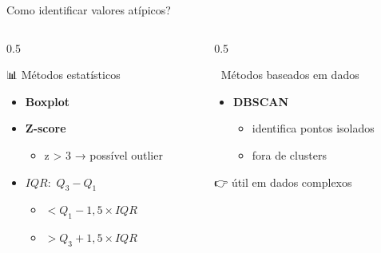 \documentclass[
  ignorenonframetext,
  aspectratio=169,
]{beamer}
\providecommand{\tightlist}{%
  \setlength{\itemsep}{0pt}\setlength{\parskip}{0pt}}
\begin{document}
\begin{frame}
\begin{block}{Como identificar valores atípicos?}
\label{como-identificar-valores-atuxedpicos}
\begin{columns}[T]
\begin{column}{0.5\linewidth}
\begin{block}{📊 Métodos estatísticos}
\label{muxe9todos-estatuxedsticos}
\begin{itemize}
\tightlist
\item
  \textbf{Boxplot}\\
\item
  \textbf{Z-score}

  \begin{itemize}
  \tightlist
  \item
    \textbar z\textbar{} \textgreater{} 3 → possível outlier
  \end{itemize}
\item
  \textbf{\(IQR:\)} \(Q_3 - Q_1\)

  \begin{itemize}
  \tightlist
  \item
    \(< Q_1 − 1,5 \times IQR\)\\
  \item
    \(> Q_3 + 1,5 \times IQR\)
  \end{itemize}
\end{itemize}
\end{block}
\end{column}

\begin{column}{0.5\linewidth}
\begin{block}{🤖 Métodos baseados em dados}
\label{muxe9todos-baseados-em-dados}
\begin{itemize}
\tightlist
\item
  \textbf{DBSCAN}

  \begin{itemize}
  \tightlist
  \item
    identifica pontos isolados\\
  \item
    fora de clusters
  \end{itemize}
\end{itemize}

👉 útil em dados complexos
\end{block}
\end{column}
\end{columns}


\end{block}
\end{frame}
\end{document}

